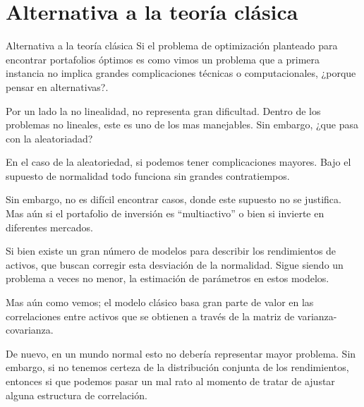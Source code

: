 \documentclass{beamer}
\begin{document}
    \section[Alternativa a la teoría cláica]{Alternativa a la teoría clásica}
    \begin{frame}{Alternativa a la teoría clásica}
        Si el problema de optimización planteado para encontrar portafolios óptimos es como vimos un problema que a primera instancia no implica grandes complicaciones técnicas o computacionales, ¿porque pensar en alternativas?.
        \par\medskip
        Por un lado la no linealidad, no representa gran dificultad. Dentro de los problemas no lineales, este es uno de los mas manejables. Sin embargo, ¿que pasa con la aleatoriadad?
    \end{frame}
    \begin{frame}
        En el caso de la aleatoriedad, si podemos tener complicaciones mayores. Bajo el supuesto de normalidad todo funciona  sin grandes contratiempos. 
        \par\medskip
        Sin embargo, no es difícil encontrar casos, donde este supuesto no se justifica. Mas aún si el portafolio de inversión es ``multiactivo'' o bien si invierte en diferentes mercados.
        \par\medskip
        Si bien existe un gran número de modelos para describir los rendimientos de activos, que buscan corregir esta desviación de la normalidad. Sigue siendo un problema a veces no menor, la estimación de parámetros en estos modelos. 
    \end{frame}
    \begin{frame}
        Mas aún como vemos; el modelo clásico basa gran parte de  valor en las correlaciones entre activos que se obtienen a través de la matriz de varianza-covarianza. 
        \par\medskip
        De nuevo, en un mundo normal esto no debería representar mayor problema. Sin embargo, si no tenemos certeza de la distribución conjunta de los rendimientos, entonces si que podemos pasar un mal rato al momento de tratar de ajustar alguna estructura de correlación.
    \end{frame}
\end{document}
